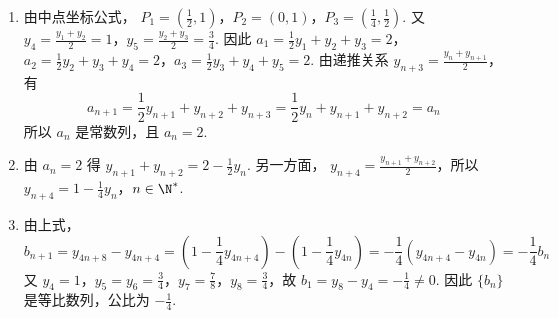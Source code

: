 \begin{solution}
\begin{enumerate}
\item 由中点坐标公式，
\(P_1=\left(\frac12,1\right)\)，\(P_2=(0,1)\)，\(P_3=\left(\frac14,\frac12\right)\). 又
\(y_4=\frac{y_1+y_2}{2}=1\)，\(y_5=\frac{y_2+y_3}{2}=\frac34\). 因此
\(a_1=\frac12y_1+y_2+y_3=2\)，\(a_2=\frac12y_2+y_3+y_4=2\)，\(a_3=\frac12y_3+y_4+y_5=2\).
由递推关系 \(y_{n+3}=\frac{y_n+y_{n+1}}2\)，有
\[
a_{n+1}=\frac12y_{n+1}+y_{n+2}+y_{n+3}
=\frac12y_n+y_{n+1}+y_{n+2}=a_n
\]
所以 \(a_n\) 是常数列，且 \(a_n=2\).
\item 由 \(a_n=2\) 得
\(y_{n+1}+y_{n+2}=2-\frac12y_n\). 另一方面，
\(y_{n+4}=\frac{y_{n+1}+y_{n+2}}2\)，所以
\(y_{n+4}=1-\frac14y_n\)，\(n\in\N^*\).
\item 由上式，
\[
b_{n+1}=y_{4n+8}-y_{4n+4}
=\left(1-\frac14y_{4n+4}\right)-\left(1-\frac14y_{4n}\right)
=-\frac14\left(y_{4n+4}-y_{4n}\right)
=-\frac14b_n
\]
又 \(y_4=1\)，\(y_5=y_6=\frac34\)，\(y_7=\frac78\)，\(y_8=\frac34\)，故
\(b_1=y_8-y_4=-\frac14\ne0\). 因此 \(\{b_n\}\) 是等比数列，公比为 \(-\frac14\).
\end{enumerate}
\end{solution}
